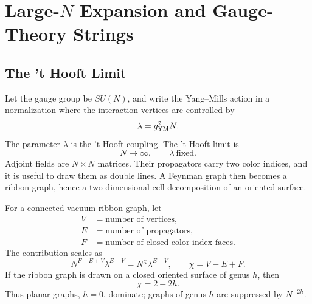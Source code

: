 \chapter{Large-\texorpdfstring{\(N\)}{N} Expansion and Gauge-Theory Strings}
\label{ch:volume-iii-large-n-expansion-gauge-theory-strings}

\section{The 't Hooft Limit}

Let the gauge group be \(SU(N)\), and write the Yang--Mills action in a
normalization where the interaction vertices are controlled by
\[
  \lambda=g_{\rm YM}^2N.
\]
The parameter \(\lambda\) is the 't Hooft coupling.  The 't Hooft limit is
\begin{equation}
  N\to\infty,
  \qquad
  \lambda\ \text{fixed}.
  \label{eq:t-hooft-limit}
\end{equation}
Adjoint fields are \(N\times N\) matrices.  Their propagators carry two color
indices, and it is useful to draw them as double lines.  A Feynman graph then
becomes a ribbon graph, hence a two-dimensional cell decomposition of an
oriented surface.

For a connected vacuum ribbon graph, let
\[
\begin{aligned}
  V&=\text{number of vertices},\\
  E&=\text{number of propagators},\\
  F&=\text{number of closed color-index faces}.
\end{aligned}
\]
The contribution scales as
\begin{equation}
  N^{F-E+V}\lambda^{E-V}
  =
  N^\chi\lambda^{E-V},
  \qquad
  \chi=V-E+F.
  \label{eq:ribbon-graph-euler-scaling}
\end{equation}
If the ribbon graph is drawn on a closed oriented surface of genus \(h\), then
\[
  \chi=2-2h.
\]
Thus planar graphs, \(h=0\), dominate; graphs of genus \(h\) are suppressed by
\(N^{-2h}\).

